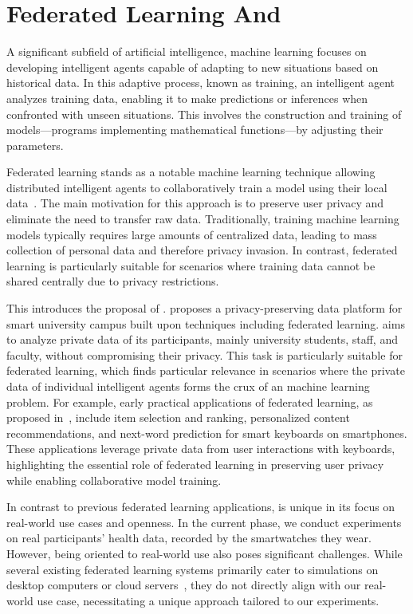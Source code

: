\section{Federated Learning And \fedcampus}

A significant subfield of artificial intelligence,
machine learning focuses on developing intelligent agents capable of adapting to
new situations based on historical data. In this adaptive process,
known as training, an intelligent agent analyzes training data,
enabling it to make predictions or inferences when confronted with unseen
situations.
This involves the construction and training of models—programs implementing
mathematical functions—by adjusting their parameters.

Federated learning
stands as a notable machine learning technique allowing distributed intelligent
agents to collaboratively train a model using their local
data~\cite{mcmahan2017communication,yang2019federated}.
The main motivation for this approach is to preserve user privacy and eliminate
the need to transfer raw data. Traditionally,
training machine learning models typically requires large amounts of centralized
data,
leading to mass collection of personal data and therefore privacy invasion.
In contrast,
federated learning is particularly suitable for scenarios where training data
cannot be shared centrally due to privacy restrictions.

This introduces the proposal of \fedcampus.
\fedcampus proposes a privacy-preserving data platform for smart university
campus built upon techniques including federated learning.
\fedcampus aims to analyze private data of its participants,
mainly university students, staff, and faculty,
without compromising their privacy.
This task is particularly suitable for federated learning,
which finds particular relevance in scenarios where the private data of
individual intelligent agents forms the crux of an machine learning problem.
For example, early practical applications of federated learning,
as proposed in~\cite{bonawitz2019towards}, include item selection and ranking,
personalized content recommendations,
and next-word prediction for smart keyboards on smartphones.
These applications leverage private data from user interactions with keyboards,
highlighting the essential role of federated learning in preserving user privacy
while enabling collaborative model training.

In contrast to previous federated learning applications,
\fedcampus is unique in its focus on real-world use cases and openness.
In the current phase, we conduct experiments on real participants' health data,
recorded by the smartwatches they wear. However,
being oriented to real-world use also poses significant challenges.
While several existing federated learning systems primarily cater to simulations
on desktop computers or cloud
servers~\cite[e.g.,][]{bonawitz2019towards,ma2019paddlepaddle,liu2021fate,openfl_citation},
they do not directly align with our real-world use case,
necessitating a unique approach tailored to our experiments.

